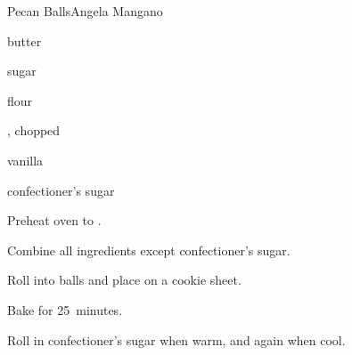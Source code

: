 \begin{recipe}{Pecan Balls}{Angela Mangano}{}

\begin{ingredients}
\item \lbs{\half} butter
\item {} sugar
\item {} flour
\item {} , chopped
\item {} vanilla
\item confectioner's sugar
\end{ingredients}

\begin{directions}
\item Preheat oven to .
\item Combine all ingredients except confectioner's sugar.
\item Roll into balls and place on a cookie sheet.
\item Bake for 25~minutes.
\item Roll in confectioner's sugar when warm, and again when cool.
\end{directions}

\end{recipe}

